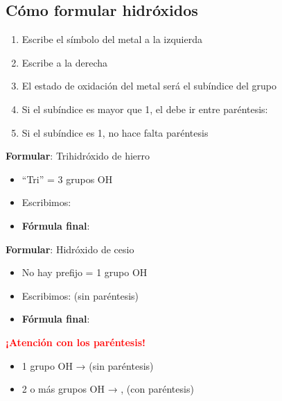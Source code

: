 \subsection{Cómo formular hidróxidos}

\begin{enumerate}
    \item Escribe el símbolo del metal a la izquierda
    \item Escribe  a la derecha
    \item El estado de oxidación del metal será el subíndice del grupo 
    \item Si el subíndice es mayor que 1, el  debe ir entre paréntesis: 
    \item Si el subíndice es 1, no hace falta paréntesis
\end{enumerate}

\begin{example}
    \textbf{Formular}: Trihidróxido de hierro

    \begin{itemize}
        \item ``Tri'' = 3 grupos OH
        \item Escribimos: 
        \item \textbf{Fórmula final}: 
    \end{itemize}

    \vspace{0.3cm}

    \textbf{Formular}: Hidróxido de cesio

    \begin{itemize}
        \item No hay prefijo = 1 grupo OH
        \item Escribimos:  (sin paréntesis)
        \item \textbf{Fórmula final}: 
    \end{itemize}
\end{example}

\vspace{0.3cm}
\singlespacing
\begin{remark}
    \textbf{\textcolor{red}{¡Atención con los paréntesis!}}
    \begin{itemize}
        \item 1 grupo OH →  (sin paréntesis)
        \item 2 o más grupos OH → ,  (con paréntesis)
    \end{itemize}
\end{remark}

